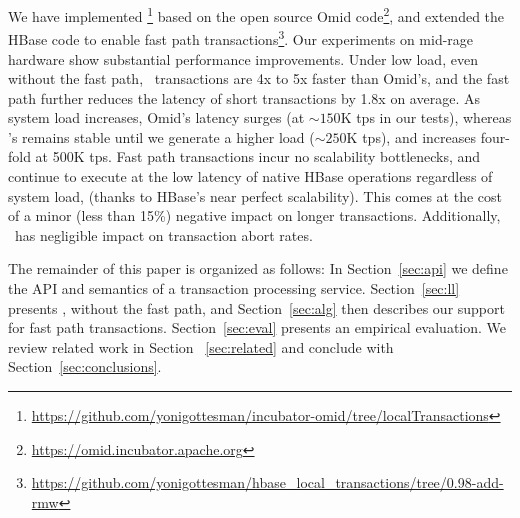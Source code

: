 We have implemented {\sys\/}\footnote{\url{https://github.com/yonigottesman/incubator-omid/tree/localTransactions}} 
based on the open source Omid code\footnote{\url{https://omid.incubator.apache.org}}, 
and extended the HBase code to enable fast path transactions\footnote{\url{https://github.com/yonigottesman/hbase_local_transactions/tree/0.98-add-rmw}}. 
Our experiments on mid-rage hardware show substantial performance improvements.
Under low load,
even without the fast path, \sys\ transactions are 4x to 5x faster than Omid's, 
and the fast path further reduces the latency of short transactions by 1.8x on average.
As system load increases, Omid's latency surges (at  $\sim\!\!\!150$K tps in our tests),  
whereas \sys's remains stable until we generate a higher load ($\sim\!\!\!250$K tps), and 
increases four-fold at 500K tps.  Fast path transactions incur no scalability
bottlenecks, and continue to execute at the low latency of native HBase operations regardless of system load,  
(thanks to HBase's near perfect scalability).
This comes at the cost of a minor (less than 15\%) negative impact on longer transactions. 
Additionally, \sys\ has negligible impact on  transaction abort rates.

The remainder of this paper is organized as follows:
In Section~\ref{sec:api} we define the  API and semantics of a transaction processing service. 
Section~\ref{sec:ll} presents \sys, without the fast path, and 
Section~\ref{sec:alg} then describes our support for fast path  transactions.  
Section~\ref{sec:eval} presents an empirical evaluation.
We review related work in Section ~\ref{sec:related} and conclude with Section~\ref{sec:conclusions}.
